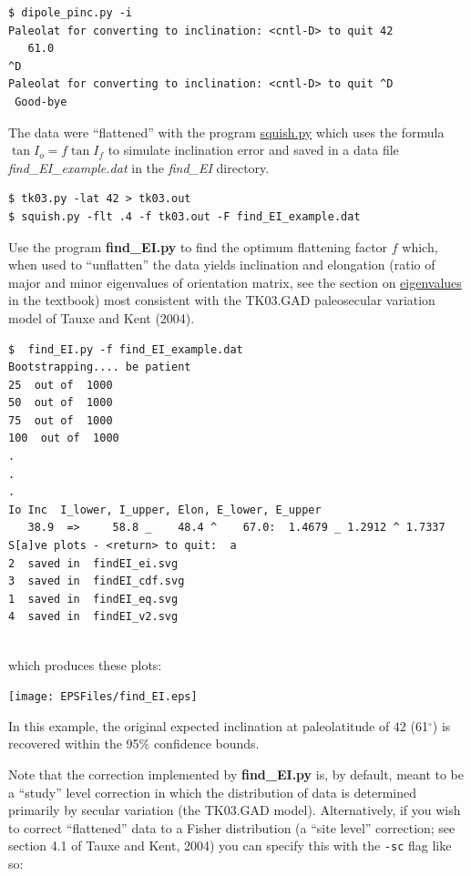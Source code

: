 \documentclass[11pt]{book}
\begin{document}
{{{\begin{verbatim}
$ dipole_pinc.py -i
Paleolat for converting to inclination: <cntl-D> to quit 42
   61.0
^D
Paleolat for converting to inclination: <cntl-D> to quit ^D
 Good-bye
\end{verbatim}


The data were ``flattened'' with the program \href{#squish.py}{squish.py} which uses the formula $ \tan I_o = f \tan I_f$ to simulate inclination error and saved in a data file {\it find\_EI\_example.dat} in the {\it find\_EI} directory.

\begin{verbatim}
$ tk03.py -lat 42 > tk03.out
$ squish.py -flt .4 -f tk03.out -F find_EI_example.dat
\end{verbatim}

Use the program {\bf find\_EI.py} to find the optimum flattening factor $f$ which, when used to ``unflatten'' the data  yields inclination   and  elongation (ratio of major and minor eigenvalues of orientation matrix, see the section on  \href{Webbook2.html#orientation_tensor}{eigenvalues} in the textbook)  most consistent with the TK03.GAD paleosecular variation model of Tauxe and Kent (2004). \nocite{tauxe04d}


\begin{verbatim}
$  find_EI.py -f find_EI_example.dat
Bootstrapping.... be patient
25  out of  1000
50  out of  1000
75  out of  1000
100  out of  1000
.
.
.
Io Inc  I_lower, I_upper, Elon, E_lower, E_upper
   38.9  =>     58.8 _    48.4 ^    67.0:  1.4679 _ 1.2912 ^ 1.7337
S[a]ve plots - <return> to quit:  a
2  saved in  findEI_ei.svg
3  saved in  findEI_cdf.svg
1  saved in  findEI_eq.svg
4  saved in  findEI_v2.svg


\end{verbatim}

\noindent which produces these plots:



\texttt{[image: EPSFiles/find\_EI.eps]}

In this example, the original expected inclination at paleolatitude of 42 (61$^{\circ}$) is recovered within the 95\% confidence bounds.

Note that the correction implemented by {\bf find\_EI.py} is, by default, meant to be a ``study'' level correction in which the distribution of data is determined primarily by secular variation (the TK03.GAD model). Alternatively, if you wish to correct ``flattened'' data to a Fisher distribution (a ``site level'' correction; see section 4.1 of Tauxe and Kent, 2004\nocite{tauxe04d}) you can specify this with the \texttt{-sc} flag like so:

}}}
\end{document}
